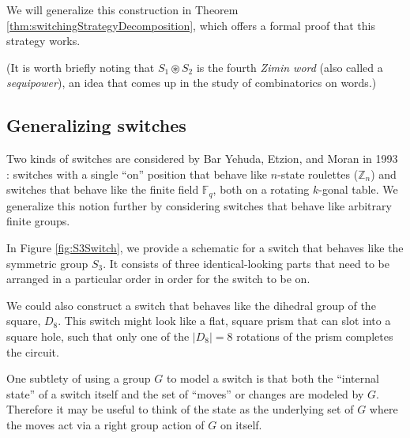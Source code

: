 We will generalize this construction in
Theorem \ref{thm:switchingStrategyDecomposition},
which offers a formal proof that this strategy works.

(It is worth briefly noting that $S_1 \circledast S_2$ is the fourth
\textit{Zimin word} (also called a \textit{sequipower}),
an idea that comes up in the study of combinatorics on words.)

\subsection{Generalizing switches}
\label{sec:GeneralizingSwitches}
Two kinds of switches are considered by Bar Yehuda, Etzion, and Moran in 1993
\cite{BarYehuda1993}: switches with a single ``on'' position that behave like
$n$-state roulettes ($\mathbb Z_n$) and switches that behave like
the finite field $\mathbb F_q$, both on a rotating $k$-gonal table.
We generalize this notion further by considering switches that behave like
arbitrary finite groups.

\begin{example}
In Figure \ref{fig:S3Switch}, we provide a schematic for a switch that behaves
like the symmetric group $S_3$.
It consists of three identical-looking parts that need to be
arranged in a particular order in order for the switch to be on.

We could also construct a switch that behaves like the dihedral group of the
square, $D_8$.
This switch might look like a flat, square prism that can slot into a square hole,
such that only one of the $|D_8| = 8$ rotations of the prism completes the circuit.
\label{ex:S3D8Schematics}
\end{example}



\begin{note}
  One subtlety of using a group $G$ to model a switch is that
  both the ``internal state'' of a switch itself and
  the set of ``moves'' or changes are modeled by $G$.
  Therefore it may be useful to think of the state as the underlying set of $G$
  where the moves act via a right group action of $G$ on itself.
\end{note}

